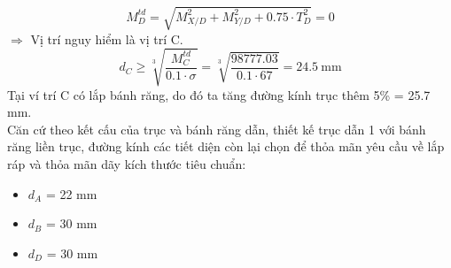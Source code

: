 \[
    M_D^{td} 
    = \sqrt{M_{X/D}^2 + M_{Y/D}^2 + 0.75 \cdot T_D^2} 
    = 0 
\]
$\Rightarrow$ Vị trí nguy hiểm là vị trí C.
\[
    d_C \ge \sqrt[3]{\frac{M_C^{td}}{0.1 \cdot \sigma}} 
        = \sqrt[3]{\frac{98777.03}{0.1 \cdot 67}} 
        = 24.5\ \text{mm}
\]
Tại ví trí C có lắp bánh răng, do đó ta tăng đường kính trục thêm 5\% = 25.7 mm. \\
Căn cứ theo kết cấu của trục và bánh răng dẫn, thiết kế trục dẫn 1 với bánh răng liền trục, đường kính các tiết diện còn lại chọn để thỏa mãn yêu cầu về lắp ráp và thỏa mãn dãy kích thước tiêu chuẩn: 
\begin{itemize}
    \item $d_A$ = 22 mm
    \item $d_B$ = 30 mm
    \item $d_D$ = 30 mm
\end{itemize}

